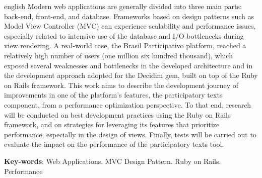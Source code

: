 \begin{resumo}[Abstract]
  \begin{otherlanguage*}{english}
    Modern web applications are generally divided into three main parts: back-end, front-end, and database. Frameworks based on design patterns such as Model View Controller (MVC) can experience scalability and performance issues, especially related to intensive use of the database and I/O bottlenecks during view rendering. A real-world case, the Brasil Participativo platform, reached a relatively high number of users (one million six hundred thousand), which exposed several weaknesses and bottlenecks in the developed architecture and in the development approach adopted for the Decidim gem, built on top of the Ruby on Rails framework. This work aims to describe the development journey of improvements in one of the platform’s features, the participatory texts component, from a performance optimization perspective. To that end, research will be conducted on best development practices using the Ruby on Rails framework, and on strategies for leveraging its features that prioritize performance, especially in the design of views. Finally, tests will be carried out to evaluate the impact on the performance of the participatory texts tool.


    \vspace{\onelineskip}

    \noindent
    \textbf{Key-words}: Web Applications. MVC Design Pattern. Ruby on Rails. Performance
  \end{otherlanguage*}
 \end{resumo}
